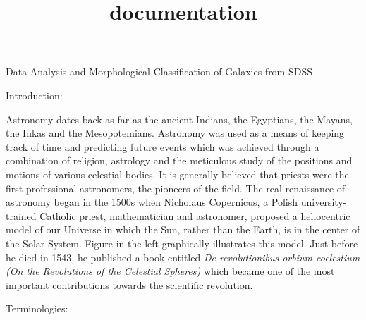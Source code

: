 \documentclass[11pt]{article}
\title{documentation}
\begin{document}
    
    
    \maketitle
    
    

    
    Data Analysis and Morphological Classification of Galaxies from SDSS

    Introduction:

Astronomy dates back as far as the ancient Indians, the Egyptians, the
Mayans, the Inkas and the Mesopotemians. Astronomy was used as a means
of keeping track of time and predicting future events which was achieved
through a combination of religion, astrology and the meticulous study of
the positions and motions of various celestial bodies. It is generally
believed that priests were the first professional astronomers, the
pioneers of the field. The real renaissance of astronomy began in the
1500s when Nicholaus Copernicus, a Polish university-trained Catholic
priest, mathematician and astronomer, proposed a heliocentric model of
our Universe in which the Sun, rather than the Earth, is in the center
of the Solar System. Figure in the left graphically illustrates this
model. Just before he died in 1543, he published a book entitled
\emph{De revolutionibus orbium coelestium (On the Revolutions of the
Celestial Spheres)} which became one of the most important contributions
towards the scientific revolution.

Terminologies:
\end{document}
